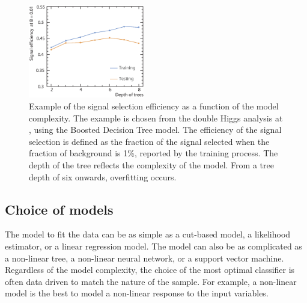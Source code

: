 

\begin{figure}[!htbp]
\includegraphics[width=0.45\textwidth]{doubleHiggs/DepthOfTrees3}
\caption{Example of the signal selection efficiency as a function of the model complexity. The example is chosen from the double Higgs analysis at , using the Boosted Decision Tree model. The efficiency of the signal selection is defined as the  fraction of the signal selected when the fraction of background  is 1\%, reported by the \TMVA training process. The depth of the tree  reflects the complexity of the model.  From a tree depth of six onwards, overfitting occurs.}
\label{fig:doubleHiggsMVAovertraining}
\end{figure}


\subsection{Choice of models}

The model to fit the data can be as simple as a cut-based model, a likelihood estimator, or a linear regression model. The model can also be as complicated as a non-linear tree, a non-linear neural network, or a support vector machine. Regardless of the model complexity, the choice of the most optimal classifier is often data driven to match the nature of the sample. For example, a non-linear model is the best to model a non-linear response to the input variables.

